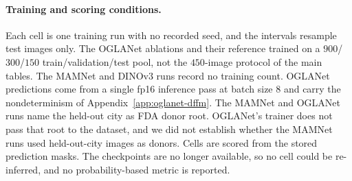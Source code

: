 \paragraph{Training and scoring conditions.} Each cell is one training run with no recorded seed, and the intervals resample test images only. The OGLANet ablations and their reference trained on a $900$/$300$/$150$ train/validation/test pool, not the $450$-image protocol of the main tables. The MAMNet and DINOv3 runs record no training count. OGLANet predictions come from a single fp16 inference pass at batch size $8$ and carry the nondeterminism of Appendix~\ref{app:oglanet-dffm}. The MAMNet and OGLANet runs name the held-out city as FDA donor root. OGLANet's trainer does not pass that root to the dataset, and we did not establish whether the MAMNet runs used held-out-city images as donors. Cells are scored from the stored prediction masks. The checkpoints are no longer available, so no cell could be re-inferred, and no probability-based metric is reported.

